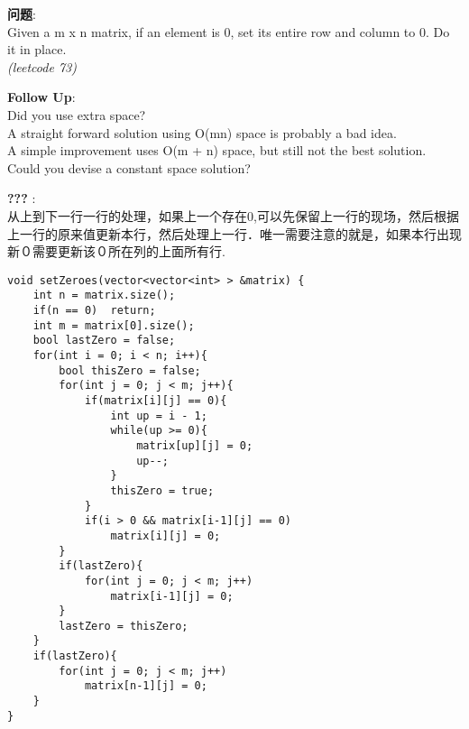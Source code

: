     
\begin{description}
    \item{\textbf{问题}}:\\
Given a m x n matrix, if an element is 0, set its entire row and column to 0. Do it in place.\\
\textit{(leetcode 73)}
    \item{\textbf{Follow Up}}:\\
Did you use extra space? \\
A straight forward solution using O(mn) space is probably a bad idea. \\
A simple improvement uses O(m + n) space, but still not the best solution. \\
Could you devise a constant space solution?
    \item{\textbf{???}} : 
    \\从上到下一行一行的处理，如果上一个存在0,可以先保留上一行的现场，然后根据上一行的原来值更新本行，然后处理上一行．唯一需要注意的就是，如果本行出现新０需要更新该０所在列的上面所有行.
    \begin{lstlisting}
void setZeroes(vector<vector<int> > &matrix) {
	int n = matrix.size();
	if(n == 0)	return;
	int m = matrix[0].size();
	bool lastZero = false;
	for(int i = 0; i < n; i++){
		bool thisZero = false;
		for(int j = 0; j < m; j++){
			if(matrix[i][j] == 0){
				int up = i - 1;
				while(up >= 0){
					matrix[up][j] = 0;
					up--;
				}
				thisZero = true;
			}
			if(i > 0 && matrix[i-1][j] == 0)
				matrix[i][j] = 0;
		}
		if(lastZero){
			for(int j = 0; j < m; j++)
				matrix[i-1][j] = 0;
		}
		lastZero = thisZero;
	}
	if(lastZero){
		for(int j = 0; j < m; j++)
			matrix[n-1][j] = 0;
	}
}
    \end{lstlisting}
\end{description}
